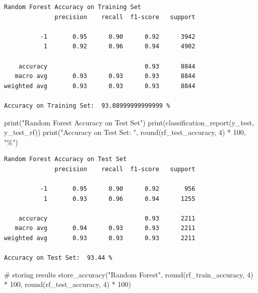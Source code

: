 \documentclass[
  letterpaper,
  DIV=11,
  numbers=noendperiod]{scrartcl}
\newenvironment{Shaded}{\begin{snugshade}}{\end{snugshade}}
\newcommand{\BuiltInTok}[1]{\textcolor[rgb]{0.00,0.23,0.31}{#1}}
\newcommand{\CommentTok}[1]{\textcolor[rgb]{0.37,0.37,0.37}{#1}}
\newcommand{\DecValTok}[1]{\textcolor[rgb]{0.68,0.00,0.00}{#1}}
\newcommand{\NormalTok}[1]{\textcolor[rgb]{0.00,0.23,0.31}{#1}}
\newcommand{\OperatorTok}[1]{\textcolor[rgb]{0.37,0.37,0.37}{#1}}
\newcommand{\StringTok}[1]{\textcolor[rgb]{0.13,0.47,0.30}{#1}}
\begin{document}
\begin{verbatim}
Random Forest Accuracy on Training Set
              precision    recall  f1-score   support

          -1       0.95      0.90      0.92      3942
           1       0.92      0.96      0.94      4902

    accuracy                           0.93      8844
   macro avg       0.93      0.93      0.93      8844
weighted avg       0.93      0.93      0.93      8844

Accuracy on Training Set:  93.08999999999999 %
\end{verbatim}

\begin{Shaded}
\begin{Highlighting}[]
\BuiltInTok{print}\NormalTok{(}\StringTok{"Random Forest Accuracy on Test Set"}\NormalTok{)}
\BuiltInTok{print}\NormalTok{(classification\_report(y\_test, y\_test\_rf))}
\BuiltInTok{print}\NormalTok{(}\StringTok{"Accuracy on Test Set: "}\NormalTok{, }\BuiltInTok{round}\NormalTok{(rf\_test\_accuracy, }\DecValTok{4}\NormalTok{) }\OperatorTok{*} \DecValTok{100}\NormalTok{, }\StringTok{"\%"}\NormalTok{)}
\end{Highlighting}
\end{Shaded}

\begin{verbatim}
Random Forest Accuracy on Test Set
              precision    recall  f1-score   support

          -1       0.95      0.90      0.92       956
           1       0.93      0.96      0.94      1255

    accuracy                           0.93      2211
   macro avg       0.94      0.93      0.93      2211
weighted avg       0.93      0.93      0.93      2211

Accuracy on Test Set:  93.44 %
\end{verbatim}

\begin{Shaded}
\begin{Highlighting}[]
\CommentTok{\# storing results}
\NormalTok{store\_accuracy(}\StringTok{"Random Forest"}\NormalTok{, }\BuiltInTok{round}\NormalTok{(rf\_train\_accuracy, }\DecValTok{4}\NormalTok{) }\OperatorTok{*} \DecValTok{100}\NormalTok{, }\BuiltInTok{round}\NormalTok{(rf\_test\_accuracy, }\DecValTok{4}\NormalTok{) }\OperatorTok{*} \DecValTok{100}\NormalTok{)}
\end{Highlighting}
\end{Shaded}
\end{document}
